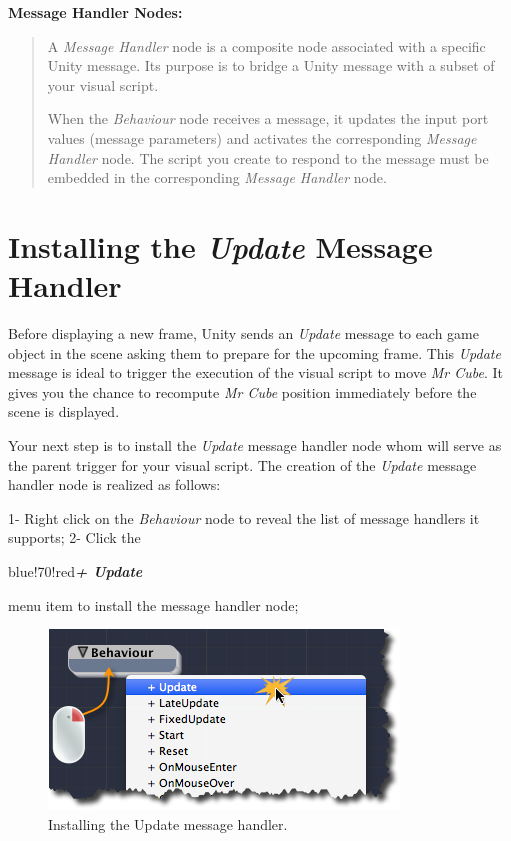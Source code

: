 \begin{tipbox}
\begin{tipbox}
\end{tipbox}


\textbf{Message Handler Nodes:}

\begin{quote}

A \emph{Message Handler} node is a composite node associated with a specific Unity message. Its purpose is to bridge a Unity message with a subset of your visual script.

When the \emph{Behaviour} node receives a message, it updates the input port values (message parameters) and activates the corresponding \emph{Message Handler} node. The script you create to respond to the message must be embedded in the corresponding \emph{Message Handler} node.
\end{quote}

\end{tipbox}



\section{Installing the \emph{Update} Message Handler}
\label{installingtheupdatemessagehandler}

Before displaying a new frame, Unity sends an \emph{Update} message to each game object in the scene asking them to prepare for the upcoming frame. This \emph{Update} message is ideal to trigger the execution of the visual script to move \emph{Mr Cube}. It gives you the chance to recompute \emph{Mr Cube} position immediately before the scene is displayed.

Your next step is to install the \emph{Update} message handler node whom will serve as the parent trigger for your visual script. The creation of the \emph{Update} message handler node is realized as follows:

1- Right click on the \emph{Behaviour} node to reveal the list of message handlers it supports;
2- Click the \begin{color}{blue!70!red}\emph{\textbf{+ Update}}\end{color} menu item to install the message handler node;

\begin{figure}[htbp]
\centering
\includegraphics[keepaspectratio,width=\textwidth,height=0.75\textheight]{installing-update-message-handler.png}
\caption{Installing the Update message handler.}
\label{installing-update-message-handler.png}
\end{figure}

